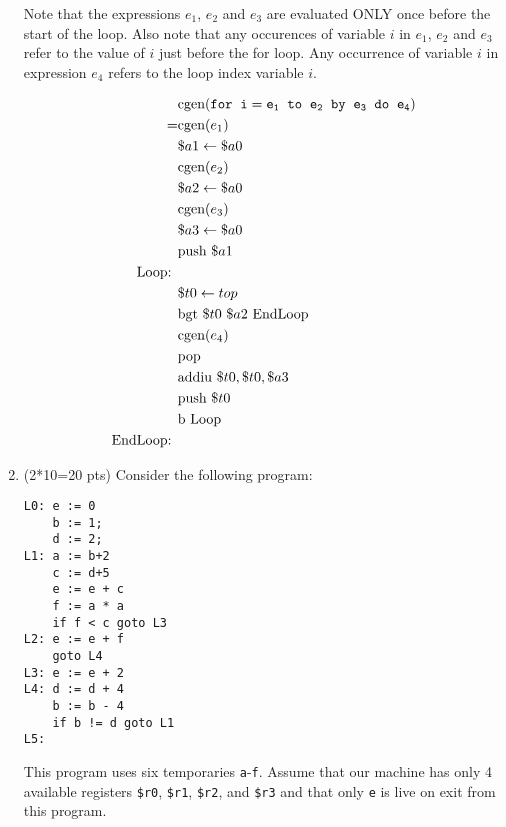 \documentclass[10pt]{article}
\begin{document}
\begin{enumerate}
Note that the expressions $e_1$, $e_2$ and $e_3$ are evaluated ONLY once before the start of the loop.
Also note that any occurences of variable $i$ in $e_1$, $e_2$ and
$e_3$ refer to the value of $i$
just before the for loop.
Any occurrence of variable $i$ in expression $e_4$ refers to the loop index variable $i$.


\begin{equation}\begin{aligned}
	  & \text{cgen}(\tt{for}\;\; i = e_1 \;\;to\;\; e_2 \;\;\tt{by}\;\; e_3 \;\;\tt{do }\;\; e_4) \\
	= & \text{cgen} (e_1) 		\\
	  & \$a1 \leftarrow \$a0	\\
	  & \text{cgen} (e_2) 		\\
	  & \$a2 \leftarrow \$a0	\\
	  & \text{cgen} (e_3) 		\\
	  & \$a3 \leftarrow \$a0	\\
	  & \text{push } \$a1 		\\
	\text{Loop: } \\
	  & \$t0 \leftarrow top 	\\
	  & \text{bgt } \$t0 \text{ } \$a2 \text{ EndLoop} \\
	  & \text{cgen} (e_4) 		\\
	  & \text{pop} 				\\
	  & \text{addiu } \$t0, \$t0, \$a3 	\\
	  & \text{push } \$t0 		\\
	  & \text{b Loop} 			\\
	\text{EndLoop: } 		\\
\end{aligned}\end{equation}

\pagebreak

\item (2*10=20 pts) Consider the following program:

\begin{verbatim}
L0: e := 0
    b := 1;
    d := 2;
L1: a := b+2
    c := d+5
    e := e + c
    f := a * a
    if f < c goto L3
L2: e := e + f
    goto L4
L3: e := e + 2
L4: d := d + 4
    b := b - 4
    if b != d goto L1
L5:
\end{verbatim}

This program uses six temporaries \texttt{a}-\texttt{f}.  Assume that
our machine has only 4 available registers \texttt{\$r0},
\texttt{\$r1}, \texttt{\$r2}, and \texttt{\$r3}
and that only
\texttt{e} is live on exit from this program.


\end{enumerate}
\end{document}
